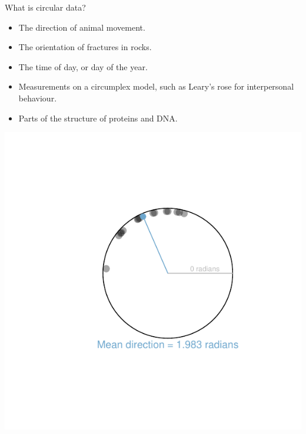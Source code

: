 \documentclass[final]{beamer}
\begin{document}
\begin{frame}
\begin{textblock}{55}
\begin{block}{\centering What is circular data?}
\begin{minipage}{0.55\textwidth}
\begin{itemize}
\item The direction of animal movement. 
\item The orientation of fractures in rocks.
\item The time of day, or day of the year.
\item Measurements on a circumplex model, such as Leary's rose for interpersonal behaviour. 
\item Parts of the structure of proteins and DNA.
\end{itemize}
\end{minipage}
\begin{minipage}{0.20\textwidth}
\includegraphics[width=\textwidth, trim = 2.8cm 2.5cm 2.1cm 2.6cm, clip]{Exampledataset1.pdf}
\end{minipage}
\begin{minipage}{0.20\textwidth}

\end{minipage}
\end{block}
\end{textblock}
\end{frame}
\end{document}
